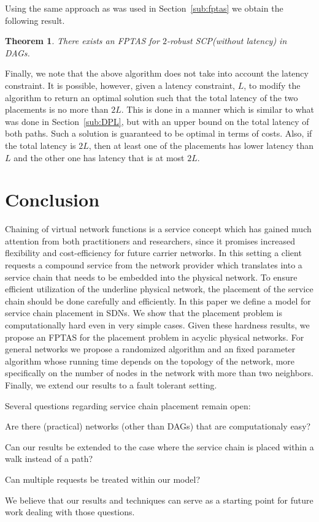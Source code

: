 \documentclass[11pt]{article}
\newtheorem{theorem}{Theorem}
\newcommand{\scp}{\textsc{SCP}\xspace}
\begin{document}
Using the same approach as was used in Section~\ref{sub:fptas} we
obtain the following result.

\begin{theorem}
There exists an FPTAS for $2$-robust \scp (without latency) in DAGs.
\end{theorem}

Finally, we note that the above algorithm does not take into account
the latency constraint.  It is possible, however, given a latency
constraint, $L$, to modify the algorithm to return an optimal solution
such that the total latency of the two placements is no more than
$2L$.  This is done in a manner which is similar to what was done in
Section~\ref{sub:DPL}, but with an upper bound on the total latency of
both paths.  Such a solution is guaranteed to be optimal in terms of
costs.  Also, if the total latency is $2L$, then at least one of the
placements has lower latency than $L$ and the other one has latency
that is at most $2L$.



\section{Conclusion}

Chaining of virtual network functions is a service concept which has
gained much attention from both practitioners and researchers, since
it promises increased flexibility and cost-efficiency for future
carrier networks.
%
In this setting a client requests a compound service from the network
provider which translates into a service chain that needs to be
embedded into the physical network.  To ensure efficient utilization
of the underline physical network, the placement of the service chain
should be done carefully and efficiently.
%
In this paper we define a model for service chain placement in SDNs.
We show that the placement problem is computationally hard even in
very simple cases.  Given these hardness results, we propose an FPTAS
for the placement problem in acyclic physical networks.  For general
networks we propose a randomized algorithm and an fixed parameter
algorithm whose running time depends on the topology of the network,
more specifically on the number of nodes in the network with more than
two neighbors.  Finally, we extend our results to a fault tolerant
setting.

Several questions regarding service chain placement remain open:
\begin{inparaenum}[(i)]
\item Are there (practical) networks (other than DAGs) that are
  computationaly easy?
\item Can our results be extended to the case where the service chain
  is placed within a walk instead of a path?
\item Can multiple requests be treated within our model?
\end{inparaenum}
We believe that our results and techniques can serve as a starting
point for future work dealing with those questions.
\end{document}
